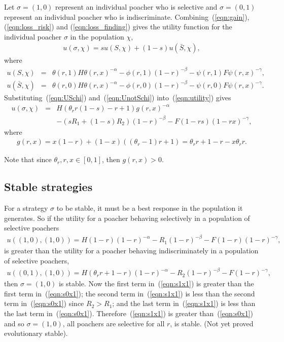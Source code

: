 \documentclass[10pt]{article}
\begin{document}
Let  $\sigma = (1,0)$ represent an individual poacher who is selective and $\sigma = (0,1)$ represent an individual poacher who is indiscriminate. Combining~(\ref{eqn:gain}), (\ref{eqn:loss_risk}) and (\ref{eqn:loss_finding}) gives the utility function for the individual poacher $\sigma$ in the population $\chi$,
\begin{eqnarray}
\label{eqn:utility}
u(\sigma, \chi) = s u(S,\chi) +(1-s) u(\bar{S},\chi),
\end{eqnarray}
where
\begin{eqnarray}
\label{eqn:USchi}
u(S,\chi) &=& \theta(r,1) H \theta(r,x)^{-\alpha}
- \phi(r,1) (1-r)^{-\beta}
- \psi(r,1) F\psi(r, x)^{-\gamma} ,
\\
\label{eqn:UnotSchi}
u(\bar{S},\chi) &=& \theta(r,0) H \theta(r,x)^{-\alpha}
- \phi(r,0) (1-r)^{-\beta}
- \psi(r,0) F\psi(r, x)^{-\gamma}.
\end{eqnarray}
Substituting~(\ref{eqn:USchi}) and~(\ref{eqn:UnotSchi}) into~(\ref{eqn:utility}) gives
\begin{eqnarray}
\label{eqn:utility2}
u(\sigma, \chi) &=&
H (\theta_r r(1-s) - r + 1)g(r,x)^{-\alpha} \\ \nonumber &&
-
(sR_1 + (1-s)R_2)(1-r)^{-\beta} - F(1-rs)(1-rx)^{-\gamma},
\end{eqnarray}
where
\begin{eqnarray}
\label{eqn:g}
g(r,x) = x(1-r)+(1-x)((\theta_r-1)r+1) = \theta_r r +1 -r - x \theta_r r.
\end{eqnarray}


Note that since $\theta_r, r, x  \in [0,1]$, then $g(r,x)>0$.

\subsection{Stable strategies}

For a strategy $\sigma$ to be stable, it must be a best response in the population it generates. So if the utility for a poacher behaving selectively in a population of selective poachers
\begin{eqnarray}
\label{eqn:s1x1}
 u((1,0),(1,0)) = H(1-r)(1-r)^{-\alpha} - R_1(1-r)^{-\beta} - F(1-r)(1-r)^{-\gamma},
\end{eqnarray}
is greater than the utility for a poacher behaving indiscriminately in a population of selective poachers,
\begin{eqnarray}
\label{eqn:s0x1}
u((0,1),(1,0)) = H(\theta_r r +1 -r)(1-r)^{-\alpha} - R_2(1-r)^{-\beta} - F(1-r)^{-\gamma},
\end{eqnarray}
then $\sigma = (1,0)$ is stable. Now the first term in~(\ref{eqn:s1x1}) is greater than the first term in~(\ref{eqn:s0x1}); the second term in~(\ref{eqn:s1x1}) is less than the second term in~(\ref{eqn:s0x1}) since $R_2 > R_1$; and the last term in~(\ref{eqn:s1x1}) is less than the last term in~(\ref{eqn:s0x1}). Therefore~(\ref{eqn:s1x1}) is greater than~(\ref{eqn:s0x1}) and so $\sigma = (1,0)$, all poachers are selective for all $r$, is stable. (Not yet proved evolutionary stable).
\end{document}
